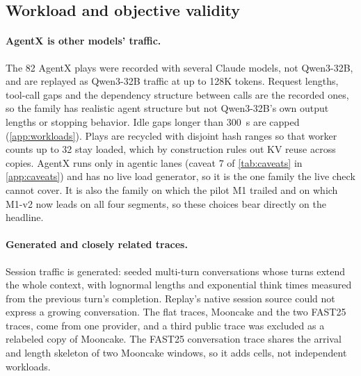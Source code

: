 \subsection{Workload and objective validity}
\label{sec:threats-workload}

\paragraph{AgentX is other models' traffic.}
The 82 AgentX plays were recorded with several Claude models, not Qwen3-32B, and are replayed as
Qwen3-32B traffic at up to 128K tokens. Request lengths, tool-call gaps and the dependency structure between
calls are the recorded ones, so the family has realistic agent structure but not Qwen3-32B's own
output lengths or stopping behavior. Idle gaps longer than \SI{300}{s} are capped
(\cref{app:workloads}). Plays are recycled with disjoint hash ranges so that worker counts up to 32
stay loaded, which by construction rules out KV reuse across copies. AgentX runs only in agentic
lanes (caveat 7 of \cref{tab:caveats} in \cref{app:caveats}) and has no live load generator, so it
is the one family the live check cannot cover. It is also the family on which the pilot M1 trailed
and on which M1-v2 now leads on all four segments, so these choices bear directly on the headline.

\paragraph{Generated and closely related traces.}
Session traffic is generated: seeded multi-turn conversations whose turns extend the whole
context, with lognormal lengths and exponential think times measured from the previous turn's
completion. Replay's native session source could not express a growing conversation. The flat
traces, Mooncake and the two FAST25 traces, come from one provider, and a third public trace was
excluded as a relabeled copy of Mooncake. The FAST25 conversation trace shares the arrival and
length skeleton of two Mooncake windows, so it adds cells, not independent workloads.

